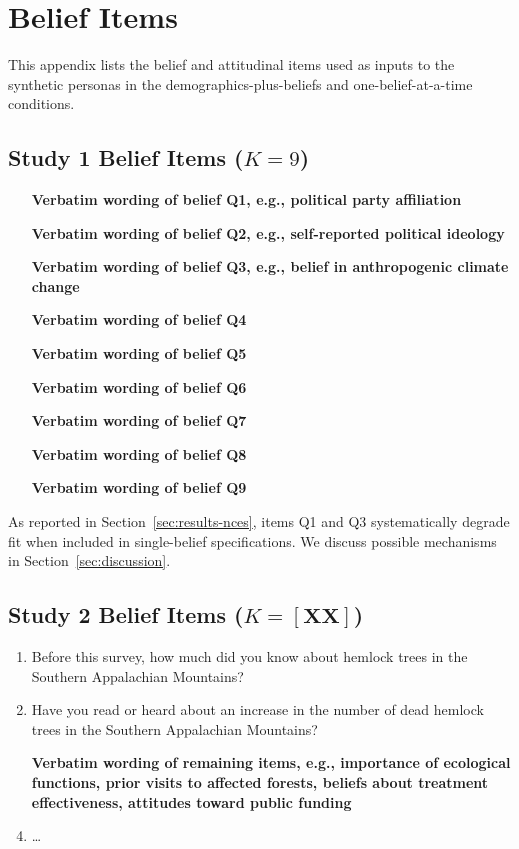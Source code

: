 \documentclass[12pt]{article}
\begin{document}
\section{Belief Items}\label{app:belief-items}

This appendix lists the belief and attitudinal items used as inputs to the synthetic personas in the demographics-plus-beliefs and one-belief-at-a-time conditions.

\subsection{Study 1 Belief Items ($K = 9$)}

\begin{enumerate}[label=Q\arabic*., leftmargin=*]
    \item [\textbf{Verbatim wording of belief Q1, e.g., political party affiliation}]
    \item [\textbf{Verbatim wording of belief Q2, e.g., self-reported political ideology}]
    \item [\textbf{Verbatim wording of belief Q3, e.g., belief in anthropogenic climate change}]
    \item [\textbf{Verbatim wording of belief Q4}]
    \item [\textbf{Verbatim wording of belief Q5}]
    \item [\textbf{Verbatim wording of belief Q6}]
    \item [\textbf{Verbatim wording of belief Q7}]
    \item [\textbf{Verbatim wording of belief Q8}]
    \item [\textbf{Verbatim wording of belief Q9}]
\end{enumerate}

\noindent As reported in Section~\ref{sec:results-nces}, items Q1 and Q3 systematically degrade fit when included in single-belief specifications. We discuss possible mechanisms in Section~\ref{sec:discussion}.

\subsection{Study 2 Belief Items ($K = [\textbf{XX}]$)}

\begin{enumerate}[label=Q\arabic*., leftmargin=*]
    \item Before this survey, how much did you know about hemlock trees in the Southern Appalachian Mountains?
    \item Have you read or heard about an increase in the number of dead hemlock trees in the Southern Appalachian Mountains?
    \item [\textbf{Verbatim wording of remaining items, e.g., importance of ecological functions, prior visits to affected forests, beliefs about treatment effectiveness, attitudes toward public funding}]
    \item \dots
\end{enumerate}
\end{document}
